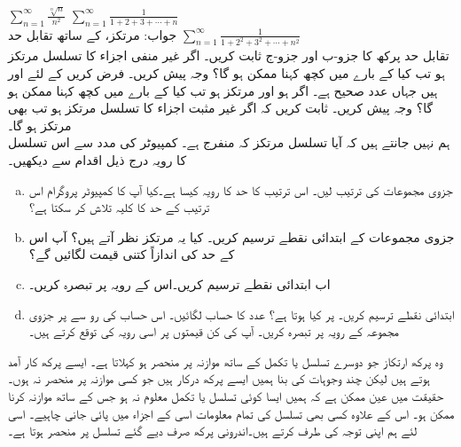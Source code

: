 $\sum\limits_{n=1}^{\infty}\frac{\sqrt[n]{n}}{n^2}$
$\sum\limits_{n=1}^{\infty}\frac{1}{1+2+3+\cdots+n}$\\
جواب:\quad
مرتکز،  کے ساتھ تقابل حد
$\sum\limits_{n=1}^{\infty}\frac{1}{1+2^2+3^2+\cdots+n^2}$
\\
تقابل حد پرکھ کا جزو-ب اور جزو-ج ثابت کریں۔ 
اگر غیر منفی اجزاء کا تسلسل  مرتکز ہو تب کیا  کے بارے میں کچھ کہنا ممکن ہو گا؟ وجہ پیش کریں۔
فرض کریں   کے لئے  اور  ہیں جہاں  عدد صحیح ہے۔ اگر  ہو اور  مرتکز ہو تب کیا  کے بارے میں کچھ کہنا ممکن ہو گا؟ وجہ پیش کریں۔
ثابت کریں کہ اگر غیر مثبت اجزاء کا تسلسل  مرتکز ہو تب  بھی مرتکز ہو گا۔
\\
ہم نہیں جانتے ہیں کہ آیا تسلسل  مرتکز کہ منفرج ہے۔ کمپیوٹر کی مدد سے اس تسلسل کا رویہ درج ذیل اقدام سے دیکھیں۔
\begin{enumerate}[a.]
\item
جزوی مجموعات  کی ترتیب لیں۔ اس ترتیب کا حد کا رویہ  کیسا ہے۔کیا آپ کا کمپیوٹر پروگرام اس ترتیب کے حد کا کلیہ تلاش کر سکتا ہے؟
\item
جزوی مجموعات کے ابتدائی  نقطے  ترسیم کریں۔  کیا یہ مرتکز نظر آتے ہیں؟ آپ اس کے حد کی اندازاً کتنی قیمت لگائیں گے؟
\item
اب ابتدائی  نقطے   ترسیم کریں۔اس کے رویہ پر تبصرہ کریں۔
\item
ابتدائی  نقطے   ترسیم کریں۔  پر کیا ہوتا ہے؟ عدد  کا حساب لگائیں۔ اس حساب کی رو سے  پر جزوی مجموعہ کے رویہ پر تبصرہ کریں۔ آپ  کی کن قیمتوں پر اسی رویہ کی توقع کرتے ہیں۔  
\end{enumerate}

وہ پرکھ ارتکاز  جو دوسرے تسلسل یا تکمل کے ساتھ موازنہ پر منحصر ہو  کہلاتا ہے۔ ایسے پرکھ کار آمد ہوتے ہیں لیکن چند وجوہات کی بنا ہمیں ایسے پرکھ درکار ہیں جو کسی موازنہ پر منحصر نہ ہوں۔ حقیقت میں عین ممکن ہے کہ ہمیں ایسا کوئی تسلسل یا تکمل معلوم نہ ہو جس کے ساتھ موازنہ کرنا ممکن ہو۔ اس کے علاوہ کسی بھی تسلسل کی تمام معلومات اسی کے اجزاء میں پائی جانی چاہیے۔ اسی لئے ہم اپنی توجہ  کی طرف  کرتے ہیں۔اندرونی پرکھ صرف دیے گئے تسلسل پر منحصر ہوتا ہے۔

